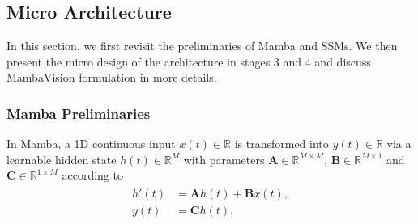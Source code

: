 \documentclass[10pt,twocolumn,letterpaper]{article}
\begin{document}
\subsection{Micro Architecture}
In this section, we first revisit the preliminaries of Mamba and SSMs. We then present the micro design of the architecture in stages 3 and 4 and discuss MambaVision formulation in more details.   
\subsubsection{Mamba Preliminaries}
In Mamba, a 1D continuous input $x(t) \in \mathbb{R}$ is transformed into $y(t) \in \mathbb{R}$ via a learnable hidden state $h(t) \in \mathbb{R}^{M}$ with parameters $\bm{A}\in\mathbb{R}^{M\times M}$, $\bm{B}\in\mathbb{R}^{M\times 1}$ and $\bm{C}\in\mathbb{R}^{1 \times M}$ according to
\begin{align}\label{eq:ode}
    \begin{split}
        h'(t) &= \bm{A}h(t) + \bm{B}x(t),\\
        y(t) &= \bm{C}h(t), %
    \end{split}
\end{align}
\end{document}
